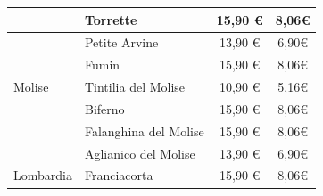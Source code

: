 \documentclass[12pt, a4paper]{article}
\begin{document}
\begin{longtable}{@{}|l|l|c|c|}
                         & Torrette                                                                  & 15,90 €                                                         & 8,06€                                                                                                         \\ \hline
                         & Petite Arvine                                                             & 13,90 €                                                         & 6,90€                                                                                                         \\ \hline
                         & Fumin                                                                     & 15,90 €                                                         & 8,06€                                                                                                         \\ \hline
    Molise               & Tintilia del Molise                                                       & 10,90 €                                                          & 5,16€                                                                                                         \\ \hline
                         & Biferno                                                                   & 15,90 €                                                         & 8,06€                                                                                                         \\ \hline
                         & Falanghina del Molise                                                     & 15,90 €                                                         & 8,06€                                                                                                         \\ \hline
                         & Aglianico del Molise                                                      & 13,90 €                                                         & 6,90€                                                                                                         \\ \hline
    Lombardia            & Franciacorta                                                              & 15,90 €                                                         & 8,06€                                                                                                         \\ \hline

\end{longtable}
\end{document}
